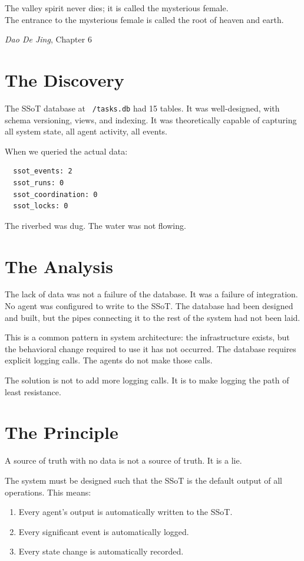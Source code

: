 \documentclass[12pt,a4paper,oneside]{book}
\begin{document}
\epigraph{The valley spirit never dies; it is called the mysterious female.\\The entrance to the mysterious female is called the root of heaven and earth.}{\textit{Dao De Jing}, Chapter 6}

\section{The Discovery}

The SSoT database at \texttt{~/tasks.db} had 15 tables. It was well-designed, with schema versioning, views, and indexing. It was theoretically capable of capturing all system state, all agent activity, all events.

When we queried the actual data:
\begin{verbatim}
  ssot_events: 2
  ssot_runs: 0
  ssot_coordination: 0
  ssot_locks: 0
\end{verbatim}

The riverbed was dug. The water was not flowing.

\section{The Analysis}

The lack of data was not a failure of the database. It was a failure of integration. No agent was configured to write to the SSoT. The database had been designed and built, but the pipes connecting it to the rest of the system had not been laid.

This is a common pattern in system architecture: the infrastructure exists, but the behavioral change required to use it has not occurred. The database requires explicit logging calls. The agents do not make those calls.

The solution is not to add more logging calls. It is to make logging the path of least resistance.

\section{The Principle}

A source of truth with no data is not a source of truth. It is a lie.

The system must be designed such that the SSoT is the default output of all operations. This means:

\begin{enumerate}
  \item Every agent's output is automatically written to the SSoT.
  \item Every significant event is automatically logged.
  \item Every state change is automatically recorded.
\end{enumerate}
\end{document}
